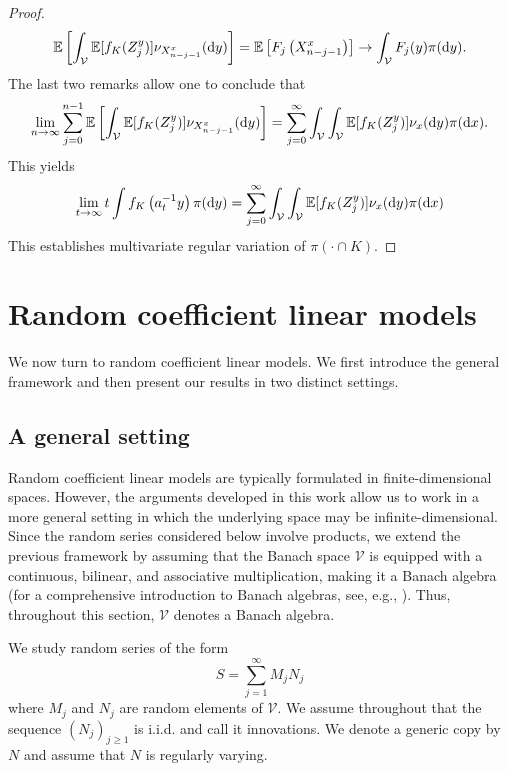 \documentclass[preprint,12pt]{elsarticle}
\theoremstyle{definition}
\theoremstyle{remark}
\newcommand{\xbf}{{ x}}
\newcommand{\ybf}{{ y}}
\newcommand{\Xbf}{{ X}}
\newcommand{\Zbf}{{ Z}}
\newcommand{\Mbf}{{ M}}
\newcommand{\Nbf}{{ N}}
\newcommand{\Sbf}{{ S}}
\newcommand{\1}{{\mathbf 1}}
\numberwithin{equation}{section}
\newcommand{\Ebb}{\mathbb{E}}  %
\newcommand{\ud}{{\rm d}}
\newcommand{\Vcal}{\mathcal{V}}
\begin{document}
\begin{proof}
	\begin{equation*}
		\Ebb \left[ \int_\Vcal \Ebb[f_K(\Zbf_j^\ybf) ] \nu_{\Xbf_{n-j-1}^\xbf } (\ud y) \right] 
		= \Ebb \left[ F_j \left( \Xbf_{n-j-1}^\xbf \right) \right] \to \int_\Vcal F_j(\ybf) \pi(\ud \ybf).
	\end{equation*}
	The last two remarks allow one to conclude that
	\begin{equation*}
		\lim_{n \to \infty}
		\sum_{j=0}^{n-1} \Ebb \left[ \int_\Vcal \Ebb[f_K(\Zbf_j^\ybf) ] \nu_{\Xbf_{n-j-1}^\xbf } (\ud y) \right]
		=\sum_{j=0}^\infty \int_\Vcal\int_\Vcal \Ebb[f_K(\Zbf_j^\ybf) ] \nu_{\xbf } (\ud y) \pi(\ud \xbf).
	\end{equation*}
	This yields 
	\begin{equation*}
		\lim_{t \to \infty}t \int f_K\left(a_t^{-1} \ybf \right) \pi(\ud \ybf)
		=\sum_{j=0}^\infty \int_\Vcal\int_\Vcal \Ebb[f_K(\Zbf_j^\ybf) ] \nu_{\xbf } (\ud y) \pi(\ud \xbf)
	\end{equation*}
	This establishes multivariate regular variation of $\pi( \cdot \cap K)$. 
\end{proof}

\section{Random coefficient linear models}\label{sec:ar}

  We now turn to random coefficient linear models. 
  We first introduce the general framework and then present our results 
  in two distinct settings.

\subsection{A general setting}

  Random coefficient linear models are typically formulated in 
  finite-di\-men\-sion\-al spaces. 
  However, the arguments developed in this work allow us to work in a more general 
  setting in which the underlying space may be infinite-dimensional. Since the random 
  series considered below involve products, we extend the previous framework by assuming 
  that the Banach space $\Vcal$ is equipped with a continuous, bilinear, and associative 
  multiplication, making it a Banach algebra (for a comprehensive introduction to Banach 
  algebras, see, e.g., \cite{conway2019course}). Thus, throughout this section, $\Vcal$ 
  denotes a Banach algebra.

  We study random series of the form
  \begin{equation*}
    \Sbf = \sum_{j=1}^\infty \Mbf_j \Nbf_j 
  \end{equation*}
  where $\Mbf_j$ and $\Nbf_j$ are random elements of $\Vcal$.
  We assume throughout that the sequence $(\Nbf_j)_{j \ge 1}$ is i.i.d. and call it innovations.
  We denote a generic copy by $\Nbf$ and assume that $\Nbf$ is regularly varying.
\end{document}
